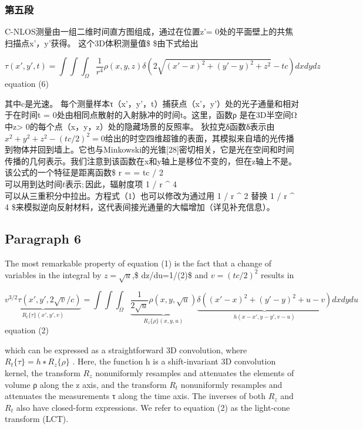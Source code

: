 \documentclass[11pt]{article}
\begin{document}
    \subsubsection{第五段}\label{ux7b2cux4e94ux6bb5}

C-NLOS测量由一组二维时间直方图组成，通过在位置z'=
0处的平面壁上的共焦扫描点x'，y'获得。 这个3D体积测量值\$
\tau \$由下式给出

\[\tau(x',y',t)=\int\int\int_{\Omega}\frac{1}{r^{4}}\rho(x,y,z)\delta(2\sqrt{(x'-x)^{2}+(y'-y)^{2}+z^{2}}-tc)dxdydz\]
equation (6)

其中c是光速。
每个测量样本τ（x'，y'，t）捕获点（x'，y'）处的光子通量和相对于在时间t =
0处由相同点散射的入射脉冲的时间t。这里，函数ρ
是在3D半空间Ω中z\textgreater{}
0的每个点（x，y，z）处的隐藏场景的反照率。
狄拉克δ函数δ表示由\(x^2+y^2+z^2-(tc/2)^2=0\)给出的时空四维超锥的表面，其模拟来自墙的光传播
到物体并回到墙上。它也与Minkowski的光锥{[}28{]}密切相关，它是光在空间和时间传播的几何表示。我们注意到该函数在x和y轴上是移位不变的，但在z轴上不是。
该公式的一个特征是距离函数\$ r =
 = tc / 2
\(可以用 到达时间t表示; 因此，辐射度项\) 1 / r \^{} 4
\(可以从三重积分中拉出。 方程式（1）也可以修改为通过用\) 1 / r \^{} 2
\(替换\) 1 / r \^{} 4
\$来模拟逆向反射材料，这代表间接光通量的大幅增加（详见补充信息）。

    \subsection{Paragraph 6}\label{paragraph-6}

The most remarkable property of equation (1) is the fact that a change
of variables in the integral by \(z=\sqrt{u}\),\$ dz/du=1/(2)\$
and \(v= (tc/2)^2\) results in

\[\underbrace{v^{3/2}\tau (x',y',2\sqrt{v} /c)}_{R_{t}\{\tau \}(x',y',v)}=\int\int\int_{\Omega}\underbrace{\frac{1}{2\sqrt{u}}\rho (x,y,\sqrt{u})}_{R_{z}\{\rho \}(x,y,u)}\underbrace{\delta((x'-x)^2+(y'-y)^2+u-v)}_{h(x-x',y-y',v-u)}dxdydu\]
equation (2)

which can be expressed as a straightforward 3D convolution, where
\(R_t\{ \tau \}=h∗R_z\{\rho \}\) . Here, the function h is a
shift-invariant 3D convolution kernel, the transform \(R_z\)
nonuniformly resamples and attenuates the elements of volume ρ along the
z axis, and the transform \(R_t\) nonuniformly resamples and attenuates
the measurements τ along the time axis. The inverses of both \(R_z\) and
\(R_t\) also have closed-form expressions. We refer to equation (2) as
the light-cone transform (LCT).
\end{document}
